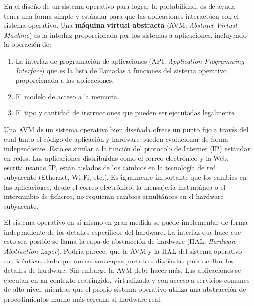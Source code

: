 \documentclass[10pt]{book}
\begin{document}
En el diseño de un sistema operativo para lograr la portabilidad, es de ayuda tener una forma simple y estándar para que  las aplicaciones interactúen con el sistema operativo. Una \textbf{máquina virtual abstracta} (AVM: \textit{Abstract Virtual Machine}) es la interfaz proporcionada por los sistemas a aplicaciones, incluyendo la operación de:
\begin{enumerate}
\item La interfaz de programación de aplicaciones (API: \textit{Application Programming Interface}) que es la lista de llamadas a funciones del sistema operativo proporcionada a las aplicaciones.
\item El modelo de acceso a la memoria.
\item El tipo y cantidad de instrucciones que pueden ser ejecutadas legalmente.
\end{enumerate}

Una AVM de un sistema operativo bien diseñada ofrece un punto fijo a través del cual tanto el código de aplicación y hardware pueden evolucionar de forma independiente. Esto es similar a la función del protocolo de Internet (IP) estándar en redes. Las aplicaciones distribuidas como el correo electrónico y la Web, escrita usando IP, están aislados de los cambios en la tecnología de red subyacente (Ethernet, Wi-Fi, etc.). Es igualmente importante que los cambios en las aplicaciones, desde el correo electrónico, la mensajería instantánea o el intercambio de ficheros, no requieran cambios simultáneos en el hardware subyacente.

El sistema operativo en sí mismo en gran medida se puede implementar de forma independiente de los detalles específicos del hardware. La interfaz que hace que esto sea posible se llama la capa de abstracción de hardware (HAL: \textit{Hardware Abstraction Layer}). Podría parecer que la AVM y la  HAL del sistema operativo son idénticas dado que ambas son capas portables diseñadas para ocultar los detalles de hardware. Sin embargo la AVM debe hacer más. Las aplicaciones se ejecutan en un contexto restringido, virtualizado y con acceso a servicios comunes de alto nivel, mientras que el propio sistema operativo utiliza una abstracción de procedimientos mucho más cercana al hardware real.
\end{document}
